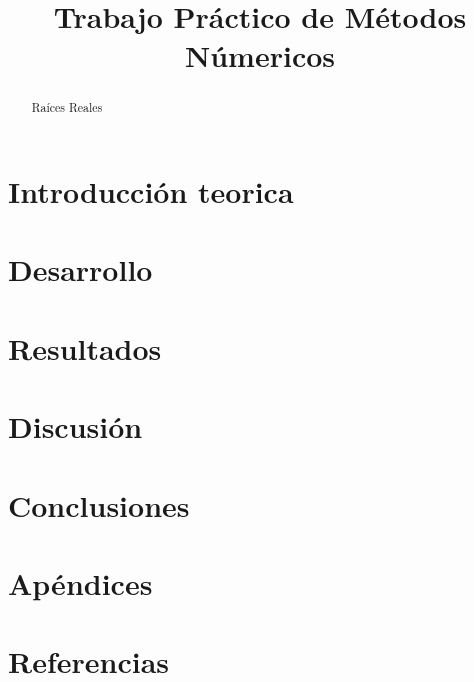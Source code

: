 \documentclass[a4paper,11pt]{article}
\title{Trabajo Práctico de Métodos Númericos}
\author{}
\begin{document}
\maketitle

\tableofcontents

\begin{abstract}
Raíces Reales
\end{abstract}

\section{Introducción teorica}



\section{Desarrollo}



\section{Resultados}



\section{Discusión}



\section{Conclusiones}



\section{Apéndices}



\section{Referencias}


\end{document}
